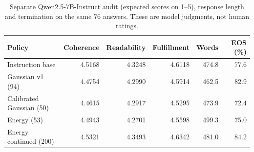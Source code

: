 \begin{table}[htbp]
\centering\footnotesize
\caption{Separate Qwen2.5-7B-Instruct audit (expected scores on 1--5), response length and termination on the same 76 answers. These are model judgments, not human ratings.}\label{tab:semantic-judge-new}
\begin{tabular}{@{}lrrrrr@{}}
\toprule
Policy & Coherence & Readability & Fulfillment & Words & EOS (\%)\\
\midrule
Instruction base & 4.5168 & 4.3248 & 4.6118 & 474.8 & 77.6\\
Gaussian v1 (94) & 4.4754 & 4.2990 & 4.5914 & 462.5 & 82.9\\
Calibrated Gaussian (50) & 4.4615 & 4.2917 & 4.5295 & 473.9 & 72.4\\
Energy (53) & 4.4943 & 4.2701 & 4.5598 & 499.3 & 75.0\\
Energy continued (200) & 4.5321 & 4.3493 & 4.6342 & 481.0 & 84.2\\
\bottomrule
\end{tabular}
\end{table}
